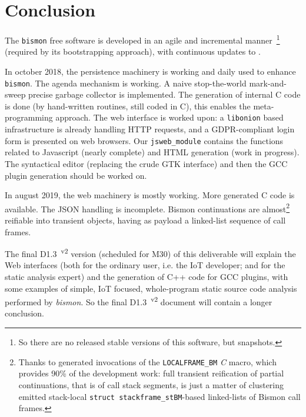 \section{Conclusion}
\label{sec:conclusion}

The \texttt{bismon} free software is developed in an agile and
incremental manner~\footnote{So there are no released stable versions
  of this software, but snapshots.} (required by its bootstrapping
approach), with continuous updates to
.

In october 2018, the persistence machinery is working and daily used
to enhance \texttt{bismon}. The agenda mechanism is working. A naive
stop-the-world mark-and-sweep precise garbage collector is
implemented. The generation of internal C code is done (by
hand-written routines, still coded in C), this enables the
meta-programming approach. The web interface is worked upon: a
\texttt{libonion} based infrastructure is already handling HTTP
requests, and a GDPR-compliant login form is presented on web
browsers. Our \texttt{jsweb\_module} contains the functions related to
Javascript (nearly complete) and HTML generation (work in progress). The
syntactical editor (replacing the crude GTK interface) and then the
GCC plugin generation should be worked on.

In august 2019, the web machinery is mostly working. More generated C
code is available. The JSON handling is incomplete. Bismon
continuations   are almost\footnote{Thanks to generated invocations of
  the \texttt{LOCALFRAME\_BM}
   \emph{C} macro, which
  provides 90\% of the development work: full transient reification of
  partial continuations, that is of   call stack segments, is just a matter of clustering emitted
  stack-local 
  \texttt{struct stackframe\_stBM}-based linked-lists of Bismon call
  frames.}  reifiable into transient  objects, having as payload a linked-list sequence of
 call frames.

The final D1.3~\textsuperscript{v2} version (scheduled for M30) of
this deliverable will explain the Web interfaces (both for the
ordinary user, i.e. the IoT developer; and for the static analysis
expert) and the generation of C++ code for GCC plugins, with some
examples of simple, IoT focused, whole-program static source code
analysis performed by \emph{bismon}. So the final
D1.3~\textsuperscript{v2} document will contain a longer conclusion.


\medskip

